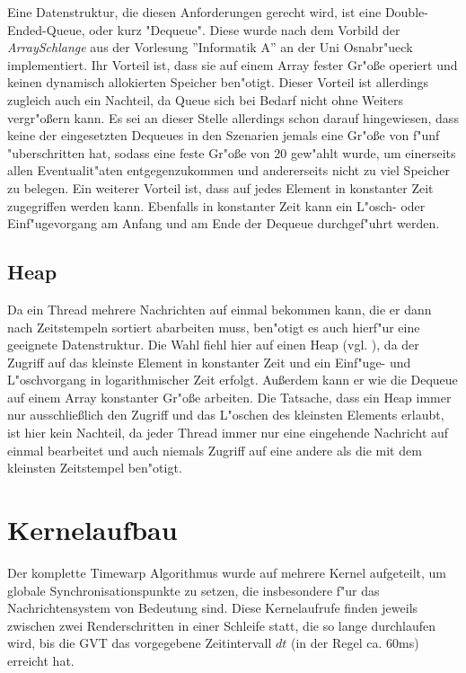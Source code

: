 \documentclass[a4paper, 10pt, openright, parskip, chapterprefix]{scrreprt}
\begin{document}
Eine Datenstruktur, die diesen Anforderungen gerecht wird, ist eine Double-Ended-Queue, oder kurz "Dequeue". Diese wurde
nach dem Vorbild der \emph{ArraySchlange} aus der Vorlesung ''Informatik A'' \cite{...} an der Uni Osnabr"ueck
implementiert. Ihr Vorteil ist, dass sie auf einem Array fester Gr"o\ss e operiert und keinen dynamisch allokierten
Speicher ben"otigt. Dieser Vorteil ist allerdings zugleich auch ein Nachteil, da Queue sich bei Bedarf nicht ohne
Weiters vergr"o\ss ern kann. Es sei an dieser Stelle allerdings schon darauf hingewiesen, dass keine der eingesetzten
Dequeues in den Szenarien jemals eine Gr"o\ss e von f"unf "uberschritten hat, sodass eine feste Gr"o\ss e von 20
gew"ahlt wurde, um einerseits allen Eventualit"aten entgegenzukommen und andererseits nicht zu viel Speicher zu belegen.
Ein weiterer Vorteil ist, dass auf jedes Element in konstanter Zeit zugegriffen werden kann. Ebenfalls in konstanter
Zeit kann ein L"osch- oder Einf"ugevorgang am Anfang und am Ende der Dequeue durchgef"uhrt werden.

\subsection{Heap}
Da ein Thread mehrere Nachrichten auf einmal bekommen kann, die er dann nach Zeitstempeln sortiert abarbeiten muss,
ben"otigt es auch hierf"ur eine geeignete Datenstruktur. Die Wahl fiehl hier auf einen Heap (vgl. \cite{...}), da der
Zugriff auf das kleinste Element in konstanter Zeit und ein Einf"uge- und L"oschvorgang in logarithmischer Zeit erfolgt.
Au\ss erdem kann er wie die Dequeue auf einem Array konstanter Gr"o\ss e arbeiten.
Die Tatsache, dass ein Heap immer nur ausschlie\ss lich den Zugriff und das L"oschen des kleinsten Elements erlaubt, ist
hier kein Nachteil, da jeder Thread immer nur eine eingehende Nachricht auf einmal bearbeitet und auch niemals Zugriff auf eine
andere als die mit dem kleinsten Zeitstempel ben"otigt.

\section{Kernelaufbau}
\label{sec:Kernelaufbau}
Der komplette Timewarp Algorithmus wurde auf mehrere Kernel aufgeteilt, um globale Synchronisationspunkte zu setzen, die
insbesondere f"ur das Nachrichtensystem von Bedeutung sind. 
Diese Kernelaufrufe finden jeweils zwischen zwei Renderschritten in einer Schleife statt, die so lange durchlaufen wird,
bis die GVT das vorgegebene Zeitintervall $dt$ (in der Regel ca. 60ms) erreicht hat.
\end{document}
